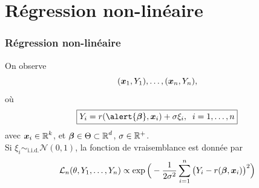 
%





\section{Régression non-linéaire}


\begin{frame}
\frametitle{Régression non-linéaire}
On observe $$(\operatorname{\boldsymbol{x}}_1,Y_1),\ldots, (\operatorname{\boldsymbol{x}}_n,Y_n),$$
où
$$\boxed{Y_i = r(\alert{\truebeta},\bx_i)+ \sigma \xi_i,\;\;i=1,\ldots,n}$$
avec $\operatorname{\boldsymbol{x}}_i\in \operatorname{{\mathbb R}}^k$, et $\boldsymbol{\beta} \in \Theta \subset \operatorname{{\mathbb R}}^d$, $\sigma \in \mathbb{R}^+$.\\
{Si $\xi_i \sim_{\text{i.i.d.}} {\mathcal N}(0,1)$, la fonction de vraisemblance est donnée par
$${\mathcal L}_n(\theta, Y_1,\ldots, Y_n) \propto \exp\Big(-\frac{1}{2\sigma^2}\sum_{i = 1}^n\big(Y_i-r(\boldsymbol{\beta},\operatorname{\boldsymbol{x}}_i)\big)^2\Big)$$
}
\end{frame}

